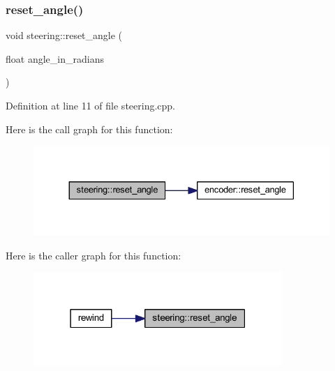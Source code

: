 \mbox{\label{classsteering_ab0fb97c4af86a1d5ed668a58fba15ba3}} 
\subsubsection{\texorpdfstring{reset\_angle()}{reset\_angle()}}
{\footnotesize\ttfamily void steering\+::reset\+\_\+angle (\begin{DoxyParamCaption}\item[{float}]{angle\+\_\+in\+\_\+radians }\end{DoxyParamCaption})}



Definition at line 11 of file steering.\+cpp.

Here is the call graph for this function\+:
\nopagebreak
\begin{figure}[H]
\begin{center}
\leavevmode
\includegraphics[width=330pt]{classsteering_ab0fb97c4af86a1d5ed668a58fba15ba3_cgraph}
\end{center}
\end{figure}
Here is the caller graph for this function\+:
\nopagebreak
\begin{figure}[H]
\begin{center}
\leavevmode
\includegraphics[width=267pt]{classsteering_ab0fb97c4af86a1d5ed668a58fba15ba3_icgraph}
\end{center}
\end{figure}
\mbox{\label{classsteering_a849eba14376618441a86e0ccdc1dc066}} 
